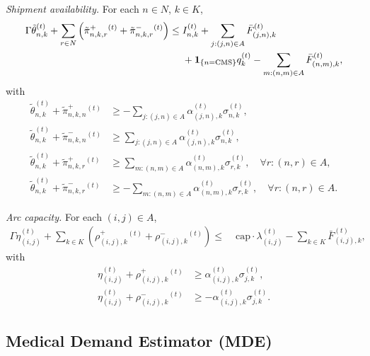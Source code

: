 \documentclass{article}
\begin{document}
\vspace{0.5em}

\textit{Shipment availability.} For each \(n \in N\), \(k \in K\),
\begin{align}
\Gamma \tilde{\theta}_{n,k}^{(t)}
+
\sum_{r \in N}
\left(
\tilde{\pi}^+_{n,k,r}{}^{(t)} + \tilde{\pi}^-_{n,k,r}{}^{(t)}
\right)
\le\;&
I_{n,k}^{(t)}
+
\sum_{j:(j,n)\in A} \bar F_{(j,n),k}^{(t)}
\notag\\
&+
\mathbf{1}_{\{n=\mathrm{CMS}\}} q_k^{(t)}
-
\sum_{m:(n,m)\in A} \bar F_{(n,m),k}^{(t)},
\end{align}
with
\begin{align}
\tilde{\theta}_{n,k}^{(t)} + \tilde{\pi}^+_{n,k,n}{}^{(t)}
&\ge
-\sum_{j:(j,n)\in A} \alpha_{(j,n),k}^{(t)} \sigma_{n,k}^{(t)}, \\
\tilde{\theta}_{n,k}^{(t)} + \tilde{\pi}^-_{n,k,n}{}^{(t)}
&\ge
\sum_{j:(j,n)\in A} \alpha_{(j,n),k}^{(t)} \sigma_{n,k}^{(t)}, \\
\tilde{\theta}_{n,k}^{(t)} + \tilde{\pi}^+_{n,k,r}{}^{(t)}
&\ge
\sum_{m:(n,m)\in A} \alpha_{(n,m),k}^{(t)} \sigma_{r,k}^{(t)},
\quad \forall r:(n,r)\in A, \\
\tilde{\theta}_{n,k}^{(t)} + \tilde{\pi}^-_{n,k,r}{}^{(t)}
&\ge
-\sum_{m:(n,m)\in A} \alpha_{(n,m),k}^{(t)} \sigma_{r,k}^{(t)},
\quad \forall r:(n,r)\in A.
\end{align}

\vspace{0.5em}

\textit{Arc capacity.} For each \((i,j) \in A\),
\begin{align}
\Gamma \eta_{(i,j)}^{(t)}
+
\sum_{k \in K}
\left(
\rho^+_{(i,j),k}{}^{(t)} + \rho^-_{(i,j),k}{}^{(t)}
\right)
\le\;&
\mathrm{cap}\cdot \lambda_{(i,j)}^{(t)}
-
\sum_{k\in K} \bar F_{(i,j),k}^{(t)},
\end{align}
with
\begin{align}
\eta_{(i,j)}^{(t)} + \rho^+_{(i,j),k}{}^{(t)}
&\ge
\alpha_{(i,j),k}^{(t)} \sigma_{j,k}^{(t)}, \\
\eta_{(i,j)}^{(t)} + \rho^-_{(i,j),k}{}^{(t)}
&\ge
-\alpha_{(i,j),k}^{(t)} \sigma_{j,k}^{(t)}.
\end{align}

\subsection{Medical Demand Estimator (MDE)}
\label{4.5}
\end{document}
